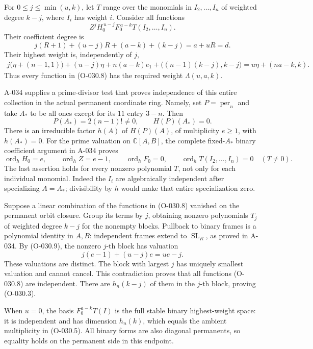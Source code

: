 For \(0\leq j\leq\min(u,k)\), let \(T\) range over the
monomials in \(I_2,\ldots,I_n\) of weighted degree \(k-j\),
where \(I_i\) has weight \(i\). Consider all functions
\[
        Z^j H_0^{\,u-j}F_0^{\,a-k}T(I_2,\ldots,I_n).
                                                               \tag{O-030.8}
\]
Their coefficient degree is
\[
 j(R+1)+(u-j)R+(a-k)+(k-j)=a+uR=d.
\]
Their highest weight is, independently of \(j\),
\[
 \begin{split}
 j\bigl(\eta+(n-1,1)\bigr)
  +(u-j)\eta+n(a-k)e_1
  +\bigl((n-1)(k-j),k-j\bigr)
   =u\eta+(na-k,k).
 \end{split}
\]
Thus every function in (O-030.8) has the required weight
\(\Lambda(u,a,k)\).

A-034 supplies a prime-divisor test that proves
independence of this entire collection in the actual
permanent coordinate ring. Namely, set \(P=\operatorname{per}_n\)
and take \(A_*\) to be all ones except for its \(11\) entry
\(3-n\). Then
\[
                P(A_*)=2(n-1)!\ne0,\qquad H(P)(A_*)=0.
\]
There is an irreducible factor \(h(A)\) of \(H(P)(A)\),
of multiplicity \(e\geq1\), with \(h(A_*)=0\). For the
prime valuation on \(\mathbb C[A,B]\), the complete
fixed-\(A_*\) binary coefficient argument in A-034 proves
\[
 \operatorname{ord}_h H_0=e,\qquad
 \operatorname{ord}_h Z=e-1,\qquad
 \operatorname{ord}_h F_0=0,\qquad
 \operatorname{ord}_h T(I_2,\ldots,I_n)=0
                                    \quad(T\ne0).             \tag{O-030.9}
\]
The last assertion holds for every nonzero polynomial
\(T\), not only for each individual monomial.
Indeed the \(I_i\) are algebraically independent after
specializing \(A=A_*\); divisibility by \(h\) would make
that entire specialization zero.

Suppose a linear combination of the functions in
(O-030.8) vanished on the permanent orbit closure.
Group its terms by \(j\), obtaining nonzero polynomials
\(T_j\) of weighted degree \(k-j\) for the nonempty
blocks. Pullback to binary frames is a polynomial
identity in \(A,B\): independent frames extend to
\(\operatorname{SL}_R\), as proved in A-034.
By (O-030.9), the nonzero \(j\)-th block has valuation
\[
                         j(e-1)+(u-j)e=ue-j.
\]
These valuations are distinct. The block with largest
\(j\) has uniquely smallest valuation and cannot cancel.
This contradiction proves that all functions (O-030.8)
are independent. There are \(h_n(k-j)\) of them in the
\(j\)-th block, proving (O-030.3).

When \(u=0\), the basis \(F_0^{a-k}T(I)\) is the full
stable binary highest-weight space: it is independent
and has dimension \(h_n(k)\), which equals the ambient
multiplicity in (O-030.5). All binary forms are also
diagonal permanents, so equality holds on the permanent
side in this endpoint.

